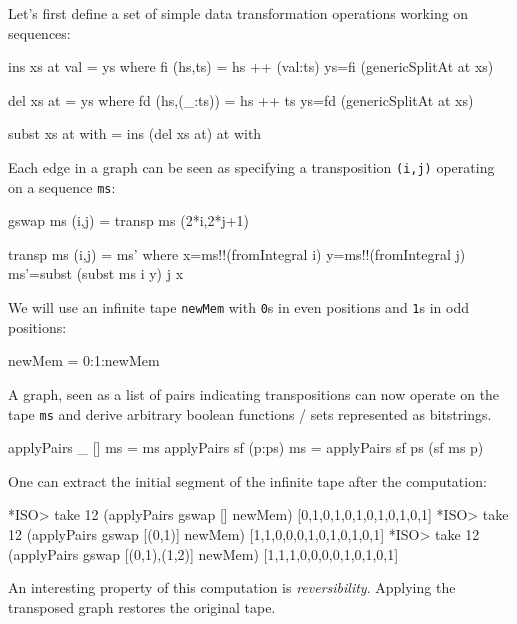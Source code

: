 \documentclass[]{INCLUDES/llncs}
\begin{document}
Let's first define a set of simple data transformation operations working on
sequences:
\begin{code}
ins xs at val = ys where
  fi (hs,ts) = hs ++ (val:ts) 
  ys=fi (genericSplitAt at xs)
 
del xs at = ys where
  fd (hs,(_:ts)) = hs ++ ts 
  ys=fd (genericSplitAt at xs)

subst xs at with = ins (del xs at) at with
\end{code}
Each edge in a graph can be seen as specifying a transposition {\tt (i,j)}
operating on a sequence {\tt ms}:
\begin{code}
gswap ms (i,j) = transp ms (2*i,2*j+1)

transp ms (i,j) = ms' where
  x=ms!!(fromIntegral i)
  y=ms!!(fromIntegral j)
  ms'=subst (subst ms i y) j x
\end{code}
We will use an infinite tape {\tt newMem} with {\tt 0}s in even positions and
{\tt 1}s in odd positions:
\begin{code}
newMem = 0:1:newMem
\end{code}
A graph, seen as a list of pairs indicating transpositions can now operate on
the tape {\tt ms} and derive arbitrary boolean functions / sets represented as
bitstrings.
\begin{code}
applyPairs _ [] ms = ms
applyPairs sf (p:ps) ms = applyPairs sf ps (sf ms p)
\end{code}
One can extract the initial segment of the infinite tape after the computation:
\begin{codex}
*ISO> take 12 (applyPairs gswap [] newMem)
[0,1,0,1,0,1,0,1,0,1,0,1]
*ISO> take 12 (applyPairs gswap [(0,1)] newMem)
[1,1,0,0,0,1,0,1,0,1,0,1]
*ISO> take 12 (applyPairs gswap [(0,1),(1,2)] newMem)
[1,1,1,0,0,0,0,1,0,1,0,1]
\end{codex}
An interesting property of this computation is {\em reversibility}. Applying
the transposed graph restores the original tape.
\end{document}
